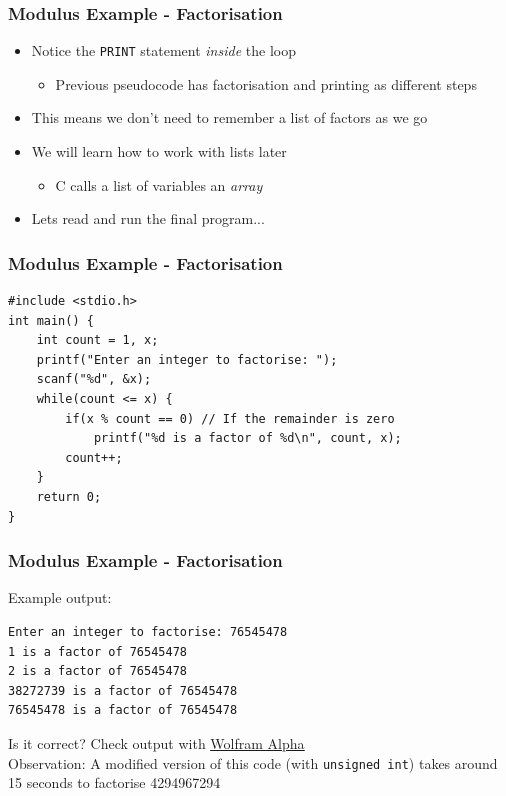 \documentclass[14pt]{beamer}
\begin{document}
\begin{frame}
\frametitle{Modulus Example - Factorisation}
\begin{itemize}
\item Notice the \texttt{PRINT} statement \textit{inside} the loop
	\begin{itemize}
		\item Previous pseudocode has factorisation and printing as different steps
	\end{itemize}
\item This means we don't need to remember a list of factors as we go
\item We will learn how to work with lists later
	\begin{itemize}
		\item C calls a list of variables an \textit{array}
	\end{itemize}
\item Lets read and run the final program...
\end{itemize}
\end{frame}

\begin{frame}[fragile]
\frametitle{Modulus Example - Factorisation}
\begin{lstlisting}[style=CStyle,basicstyle=\ttfamily\footnotesize]
#include <stdio.h>
int main() {
	int count = 1, x;
	printf("Enter an integer to factorise: ");
	scanf("%d", &x);
	while(count <= x) {
		if(x % count == 0) // If the remainder is zero
			printf("%d is a factor of %d\n", count, x);
		count++;
	}
	return 0;
}
\end{lstlisting}
\end{frame}

\begin{frame}[fragile]
\frametitle{Modulus Example - Factorisation}
Example output:
\begin{lstlisting}[style=pseudo]
Enter an integer to factorise: 76545478
1 is a factor of 76545478
2 is a factor of 76545478
38272739 is a factor of 76545478
76545478 is a factor of 76545478
\end{lstlisting}

Is it correct? Check output with \underline{\href{https://www.wolframalpha.com/input/?i=factors+of+76545478}{Wolfram Alpha}}
\\
\vspace{5mm}
Observation: A modified version of this code (with \texttt{unsigned int}) takes around 15 seconds to factorise 4294967294
\end{frame}
\end{document}
